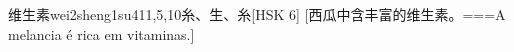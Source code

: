 \begin{EntryWithPhonetic}{维生素}{wei2sheng1su4}{11,5,10}{⽷、⽣、⽷}[HSK 6]
  [西瓜中含丰富的维生素。===A melancia é rica em vitaminas.]
\end{EntryWithPhonetic}
